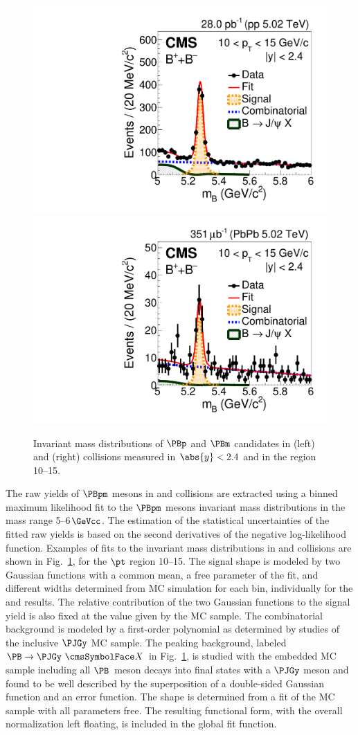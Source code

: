 \begin{figure}[tb]
\centering
\includegraphics[width=.49\textwidth]{Figure_001-a.pdf}
\includegraphics[width=.49\textwidth]{Figure_001-b.pdf}
\caption{Invariant mass distributions of $\PBp$ and $\PBm$ candidates in \pp (left) and \PbPb (right) collisions measured in $\abs{y}<2.4$ and in the \pt region 10--15\GeVc.}
\label{fig:rawYieldsBmeson}

\end{figure}

The raw yields of $\PBpm$ mesons in \pp and \PbPb collisions are extracted using a binned maximum likelihood fit to the $\PBpm$ mesons invariant mass distributions in the mass range 5--6$\GeVcc$. The estimation of the statistical uncertainties of the fitted
raw yields is based on the second derivatives of the
negative log-likelihood function. Examples of fits to the invariant mass distributions in \pp and \PbPb collisions are shown in Fig.~\ref{fig:rawYieldsBmeson}, for the $\pt$ region 10--15\GeVc.
The signal shape is modeled by two Gaussian functions with a common mean, a free parameter of the fit, and different widths determined from MC simulation for each \pt bin, individually for the \pp and \PbPb results. The relative contribution of the two Gaussian functions to the signal yield is also fixed at the value given by the MC sample.
The combinatorial background is modeled by a first-order polynomial as determined by studies of the inclusive $\PJGy$ MC sample. The peaking background, labeled $\Bjpsixdecay$ in Fig.~\ref{fig:rawYieldsBmeson}, is studied with the embedded MC sample including all $\PB$~meson decays into final states with a $\PJGy$ meson and found to be well described by the superposition of a double-sided Gaussian function and an error function. The shape is determined from a fit of the MC sample with all parameters free. The resulting functional form, with the overall normalization left floating, is included in the global fit function.

